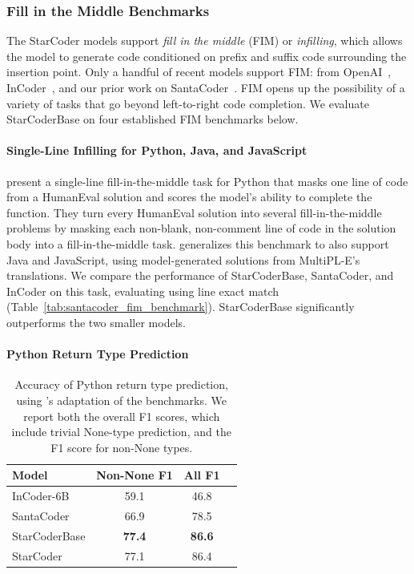 \documentclass[10pt]{article} %
\begin{document}
\subsubsection{Fill in the Middle Benchmarks}

The StarCoder models support \emph{fill in the middle} (FIM) or \emph{infilling}, which allows the model to generate code conditioned on prefix and suffix code surrounding the insertion point. Only a handful of recent models support FIM: from OpenAI~\citep{bavarian2022fim}, InCoder~\citep{fried2022incoder}, and our prior work on SantaCoder~\citep{allal2023santacoder}. FIM opens up the possibility of a variety of tasks that go beyond left-to-right code completion. We evaluate StarCoderBase on four established FIM benchmarks below.


\paragraph{Single-Line Infilling for Python, Java, and JavaScript}

\citet{fried2022incoder} present a single-line fill-in-the-middle task for Python that masks one line of code from a HumanEval solution and scores the model's ability to complete the function. They turn every HumanEval solution into several fill-in-the-middle problems by masking each non-blank, non-comment line of code in the solution body into a fill-in-the-middle task.
\citet{allal2023santacoder} generalizes this benchmark to also support Java and JavaScript, using model-generated solutions from MultiPL-E's translations. We compare the performance of StarCoderBase, SantaCoder, and InCoder on this task, evaluating using line exact match (Table~\ref{tab:santacoder_fim_benchmark}). StarCoderBase significantly outperforms the two smaller models.


\paragraph{Python Return Type Prediction}
\begin{table}[t]
\centering
\begin{tabular}{lccc}
\toprule
\textbf{Model} & \textbf{Non-None F1} & \textbf{All F1} \\
\midrule
InCoder-6B & 59.1 & 46.8  \\
SantaCoder & 66.9 & 78.5  \\
StarCoderBase  & \textbf{77.4} & \textbf{86.6} \\
StarCoder & 77.1 & 86.4 \\
\bottomrule
\end{tabular}
\caption{Accuracy of Python return type prediction, using \cite{fried2022incoder}'s adaptation of the \cite{pradel:typewriter} benchmarks. We report both the overall F1 scores, which include trivial None-type prediction, and the F1 score for non-None types.} 
\label{tab:Python_return_type}
\end{table}
\end{document}
